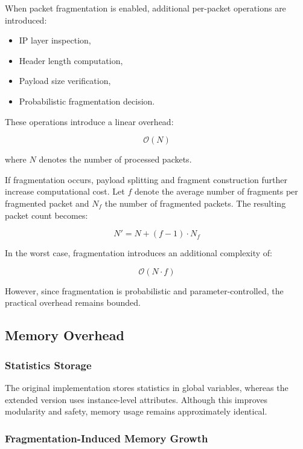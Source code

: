 When packet fragmentation is enabled, additional per-packet operations are introduced:
\begin{itemize}
    \item IP layer inspection,
    \item Header length computation,
    \item Payload size verification,
    \item Probabilistic fragmentation decision.
\end{itemize}

These operations introduce a linear overhead:

\begin{equation}
\mathcal{O}(N)
\end{equation}

where $N$ denotes the number of processed packets.

If fragmentation occurs, payload splitting and fragment construction further increase computational cost. Let $f$ denote the average number of fragments per fragmented packet and $N_f$ the number of fragmented packets. The resulting packet count becomes:

\begin{equation}
N' = N + (f - 1) \cdot N_f
\end{equation}

In the worst case, fragmentation introduces an additional complexity of:

\begin{equation}
\mathcal{O}(N \cdot f)
\end{equation}

However, since fragmentation is probabilistic and parameter-controlled, the practical overhead remains bounded.

\subsection{Memory Overhead}

\subsubsection{Statistics Storage}

The original implementation stores statistics in global variables, whereas the extended version uses instance-level attributes. Although this improves modularity and safety, memory usage remains approximately identical.

\subsubsection{Fragmentation-Induced Memory Growth}

